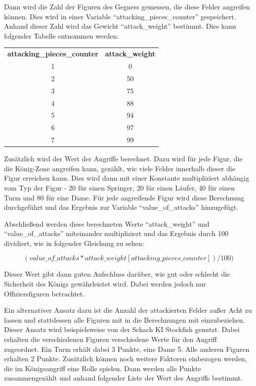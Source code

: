 Dann wird die Zahl der Figuren des Gegners gemessen, die diese Felder angreifen können. Dies wird in einer Variable ``attacking\_pieces\_counter'' gespeichert. Anhand dieser Zahl wird das Gewicht ``attack\_weight'' bestimmt. Dies kann folgender Tabelle entnommen werden: \cite{O.V.2019b}

\begin{tabular}{c c}
\textbf{attacking\_pieces\_counter} & \textbf{attack\_weight}\\
1 & 0\\
2 & 50\\
3 & 75\\
4 & 88\\
5 & 94\\
6 & 97\\
7 & 99
\end{tabular}

Zusätzlich wird der Wert der Angriffe berechnet. Dazu wird für jede Figur, die die König-Zone angreifen kann, gezählt, wie viele Felder innerhalb dieser die Figur erreichen kann. Dies wird dann mit einer Konstante multipliziert abhängig vom Typ der Figur - 20 für einen Springer, 20 für einen Läufer, 40 für einen Turm und 80 für eine Dame. Für jede angreifende Figur wird diese Berechnung durchgeführt und das Ergebnis zur Variable ``value\_of\_attacks'' hinzugefügt.  \cite{O.V.2019b}

Abschließend werden diese berechneten Werte ``attack\_weight'' und ``value\_of\_attacks'' miteinander multipliziert und das Ergebnis durch 100 dividiert, wie in folgender Gleichung zu sehen: \cite{O.V.2019b}

\begin{equation}
(value\_of\_attacks * attack\_weight[attacking\_pieces\_counter]) / 100)
\end{equation}

Dieser Wert gibt dann guten Aufschluss darüber, wie gut oder schlecht die Sicherheit des Königs gewährleistet wird. Dabei werden jedoch nur Offiziersfiguren betrachtet.

Ein alternativer Ansatz dazu ist die Anzahl der attackierten Felder außer Acht zu lassen und stattdessen alle Figuren mit in die Berechnungen mit einzubeziehen. Dieser Ansatz wird beispielsweise von der Schach KI Stockfish genutzt. Dabei erhalten die verschiedenen Figuren verschiedene Werte für den Angriff zugeordnet. Ein Turm erhält dabei 3 Punkte, eine Dame 5. Alle anderen Figuren erhalten 2 Punkte. Zusätzlich können noch weitere Faktoren einbezogen werden, die im Königsangriff eine Rolle spielen. Dann werden alle Punkte zusammengezählt und anhand folgender Liste der Wert des Angriffs bestimmt. \cite{O.V.2019b}

